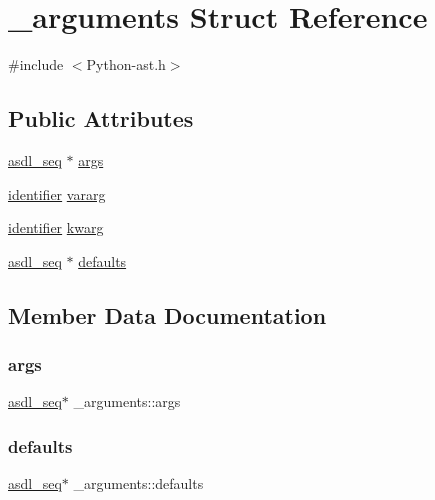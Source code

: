 \hypertarget{struct__arguments}{}\section{\+\_\+arguments Struct Reference}
\label{struct__arguments}


{\ttfamily \#include $<$Python-\/ast.\+h$>$}

\subsection*{Public Attributes}
\begin{DoxyCompactItemize}
\item 
\mbox{\hyperlink{structasdl__seq}{asdl\+\_\+seq}} $\ast$ \mbox{\hyperlink{struct__arguments_a8c7f1276ee2548bfb5f83e1226a81120}{args}}
\item 
\mbox{\hyperlink{asdl_8h_a78ca2081e230a95abc88c411c9816775}{identifier}} \mbox{\hyperlink{struct__arguments_a170875f77861eaf53e52cfe0c418ec16}{vararg}}
\item 
\mbox{\hyperlink{asdl_8h_a78ca2081e230a95abc88c411c9816775}{identifier}} \mbox{\hyperlink{struct__arguments_adaf47d76b5e7fd83511eceee4768b411}{kwarg}}
\item 
\mbox{\hyperlink{structasdl__seq}{asdl\+\_\+seq}} $\ast$ \mbox{\hyperlink{struct__arguments_a23d24a2fa218bdb0a430df6353d19b63}{defaults}}
\end{DoxyCompactItemize}


\subsection{Member Data Documentation}
\mbox{\label{struct__arguments_a8c7f1276ee2548bfb5f83e1226a81120}} 
\subsubsection{\texorpdfstring{args}{args}}
{\footnotesize\ttfamily \mbox{\hyperlink{structasdl__seq}{asdl\+\_\+seq}}$\ast$ \+\_\+arguments\+::args}

\mbox{\label{struct__arguments_a23d24a2fa218bdb0a430df6353d19b63}} 
\subsubsection{\texorpdfstring{defaults}{defaults}}
{\footnotesize\ttfamily \mbox{\hyperlink{structasdl__seq}{asdl\+\_\+seq}}$\ast$ \+\_\+arguments\+::defaults}

